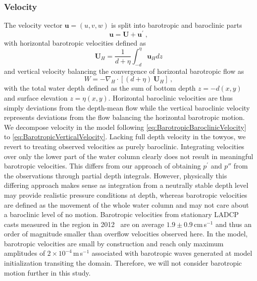 \documentclass{ametsocV6.1}
\begin{document}
\subsubsection{Velocity}
The velocity vector $\mathbf{u}=(u,v,w)$ is split into barotropic and baroclinic parts
\begin{equation}
\mathbf{u} = \mathbf{U} + \mathbf{u^\prime}\ ,
\label{eq:BarotropicBaroclinicVelocity}
\end{equation}
with horizontal barotropic velocities defined as
\begin{equation}
\mathbf{U}_H = \frac{1}{d+\eta} \int_{-d}^{\eta} \mathbf{u}_H dz
\label{eq:BarotropicHorizontalVelocity}
\end{equation}
and vertical velocity balancing the convergence of horizontal barotropic flow as
\begin{equation}
W = -\nabla_H \cdot  \left[ (d+\eta)\ \mathbf{U}_H \right]\ ,
\label{eq:BarotropicVerticalVelocity}
\end{equation}
with the total water depth defined as the sum of bottom depth $z = -d(x,y)$ and surface elevation $z = \eta(x,y)$.
Horizontal baroclinic velocities are thus simply deviations from the depth-mean flow while the vertical baroclinic velocity represents deviations from the flow balancing the horizontal barotropic motion.
We decompose velocity in the model following \eqref{eq:BarotropicBaroclinicVelocity} to \eqref{eq:BarotropicVerticalVelocity}.
Lacking full depth velocity in the towyos, we revert to treating observed velocities as purely baroclinic.
Integrating velocities over only the lower part of the water column clearly does not result in meaningful barotropic velocities.
This differs from our approach of obtaining $p^\prime$ and $p''$ from the observations through partial depth integrals.
However, physically this differing approach makes sense as integration from a neutrally stable depth level may provide realistic pressure conditions at depth, whereas barotropic velocities are defined as the movement of the whole water column and may not care about a baroclinic level of no motion.
Barotropic velocities from stationary LADCP casts measured in the region in 2012~\citep{voetetal15} are on average $1.9\pm0.9$\,cm\,s$^{-1}$ and thus an order of magnitude smaller than overflow velocities observed here.
In the model, barotropic velocities are small by construction and reach only maximum amplitudes of $2\times10^{-4}$\,m\,s$^{-1}$ associated with barotropic waves generated at model initialization transiting the domain.
Therefore, we will not consider barotropic motion further in this study.
\end{document}
